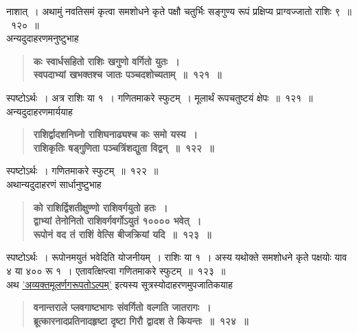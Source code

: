 \documentclass[11pt, openany]{book}
\begin{document}
\begin{sloppypar}
\noindent नाशात्~। अथामुं नवतिसमं कृत्वा समशोधने कृते पक्षौ चतुर्भिः सङ्गुण्य रूपं प्रक्षिप्य प्राग्वज्जातो राशिः ९~॥~१२०~॥\\

{\small अन्यदुदाहरणमनुष्टुभाह\textendash }

 \label{8.121}
\begin{quote}
{\large \textbf{{\color{purple}कः स्वार्धसहितो राशिः खगुणो वर्गितो युतः~।\\
स्वपदाभ्यां खभक्तश्च जातः पञ्चदशोच्यताम्~॥~१२१~॥}}}
\end{quote}

स्पष्टोऽर्थः~। अत्र राशिः या १~। गणितमाकरे स्फुटम्~। मूलार्थं रूपचतुष्टयं क्षेपः~॥~१२१~॥\\

{\small अन्यदुदाहरणमार्ययाह\textendash }

 \label{8.122}
\begin{quote}
{\large \textbf{{\color{purple}राशिर्द्वादशनिघ्नो राशिघनाढ्यश्च कः समो यस्य~।\\
राशिकृतिः षड्गुणिता पञ्चत्रिंशद्युता विद्वन्~॥~१२२~॥}}}
\end{quote}

स्पष्टोऽर्थः~। गणितमाकरे स्फुटम्~॥~१२२~॥\\

{\small अथान्यदुदाहरणं सार्धानुष्टुभाह\textendash }

 \label{8.123}
\begin{quote}
{\large \textbf{{\color{purple}को राशिर्द्विशतीक्षुण्णो राशिवर्गयुतो हतः~।\\
द्वाभ्यां तेनोनितो राशिवर्गवर्गोऽयुतं १०००० भवेत्~।\\
रूपोनं वद तं राशिं वेत्सि बीजक्रियां यदि~॥~१२३~॥}}}
\end{quote}

स्पष्टोऽर्थः~। रूपोनमयुतं भवेदिति योजनीयम्~। राशिः या १~। अस्य यथोक्ते समशोधने कृते पक्षयोः याव ४ या ४०० रू १~। एतावत्क्षिप्त्वा गणितमाकरे स्फुटम्~॥~१२३~॥\\

{\small अथ \hyperref[8.115]{'अव्यक्तमूलर्णगरूपतोऽल्पम्'} इत्यस्य सूत्रस्योदाहरणमुपजातिकयाह\textendash }

 \label{8.124}
\begin{quote}
{\large \textbf{{\color{purple}वनान्तराले प्लवगाष्टभागः संवर्गितो वल्गति जातरागः~।\\
ब्रूत्कारनादप्रतिनादहृष्टा दृष्टा गिरौ द्वादश ते कियन्तः~॥~१२४~॥}}}
\end{quote}


\end{sloppypar}
\end{document}
